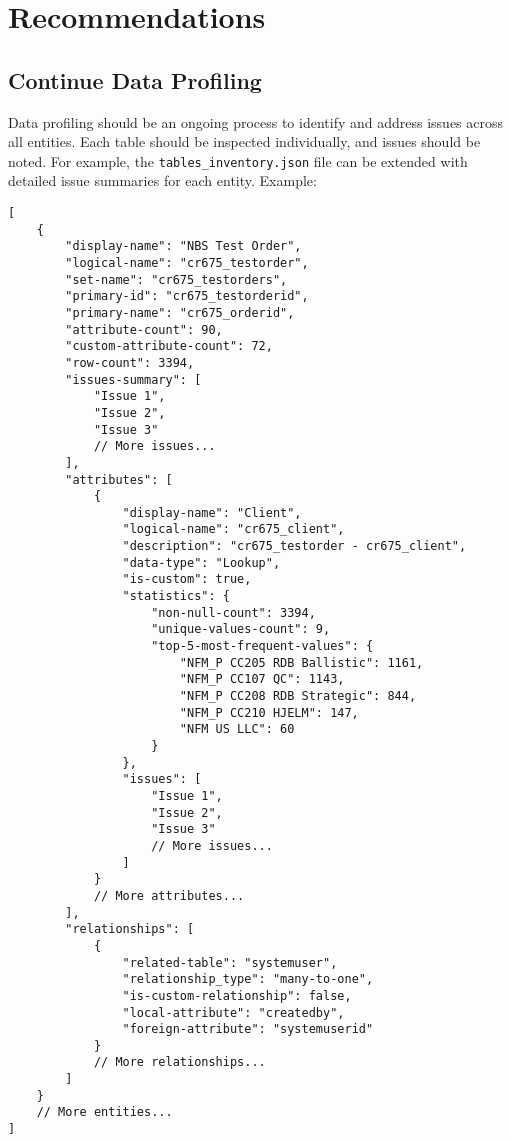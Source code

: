 \section{Recommendations}

\subsection{Continue Data Profiling}
Data profiling should be an ongoing process to identify and address issues across all entities. Each table should be inspected individually, and issues should be noted. For example, the \texttt{tables\_inventory.json} file can be extended with detailed issue summaries for each entity. Example:

\begin{verbatim}
[
    {
        "display-name": "NBS Test Order",
        "logical-name": "cr675_testorder",
        "set-name": "cr675_testorders",
        "primary-id": "cr675_testorderid",
        "primary-name": "cr675_orderid",
        "attribute-count": 90,
        "custom-attribute-count": 72,
        "row-count": 3394,
        "issues-summary": [
            "Issue 1",
            "Issue 2",
            "Issue 3"
            // More issues...
        ],
        "attributes": [
            {
                "display-name": "Client",
                "logical-name": "cr675_client",
                "description": "cr675_testorder - cr675_client",
                "data-type": "Lookup",
                "is-custom": true,
                "statistics": {
                    "non-null-count": 3394,
                    "unique-values-count": 9,
                    "top-5-most-frequent-values": {
                        "NFM_P CC205 RDB Ballistic": 1161,
                        "NFM_P CC107 QC": 1143,
                        "NFM_P CC208 RDB Strategic": 844,
                        "NFM_P CC210 HJELM": 147,
                        "NFM US LLC": 60
                    }
                },
                "issues": [
                    "Issue 1",
                    "Issue 2",
                    "Issue 3"
                    // More issues...
                ]
            }
            // More attributes... 
        ],
        "relationships": [
            {
                "related-table": "systemuser",
                "relationship_type": "many-to-one",
                "is-custom-relationship": false,
                "local-attribute": "createdby",
                "foreign-attribute": "systemuserid"
            }
            // More relationships...
        ]
    }
    // More entities...
]
\end{verbatim}

